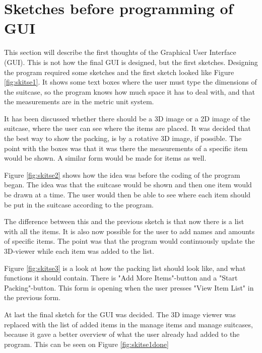 \section{Sketches before programming of GUI}
\label{sec:sketches}
This section will describe the first thoughts of the Graphical User Interface (GUI). This is not how the final GUI is designed, but the first sketches.
Designing the program required some sketches and the first sketch looked like Figure \ref{fig:skitse1}.
It shows some text boxes where the user must type the dimensions of the suitcase, so the program knows how much space it has to deal with, and that the measurements are in the metric unit system.


It has been discussed whether there should be a 3D image or a 2D image of the suitcase, where the user can see where the items are placed. It was decided that the best way to show the packing, is by a rotative 3D image, if possible.
The point with the boxes was that it was there the measurements of a specific item would be shown.
A similar form would be made for items as well.


Figure \ref{fig:skitse2} shows how the idea was before the coding of the program began. The idea was that the suitcase would be shown and then one item would be drawn at a time. The user would then be able to see where each item should be put in the suitcase according to the program.

The difference between this and the previous sketch is that now there is a list with all the items. It is also now possible for the user to add names and amounts of specific items. The point was that the program would continuously update the 3D-viewer while each item was added to the list.


Figure \ref{fig:skitse3} is a look at how the packing list should look like, and what functions it should contain.
There is "Add More Items"-button and a "Start Packing"-button. This form is opening when the user presses "View Item List" in the previous form.

At last the final sketch for the GUI was decided. The 3D image viewer was replaced with the list of added items in the manage items and manage suitcases, because it gave a better overview of what the user already had added to the program. This can be seen on Figure \ref{fig:skitse1done} 

